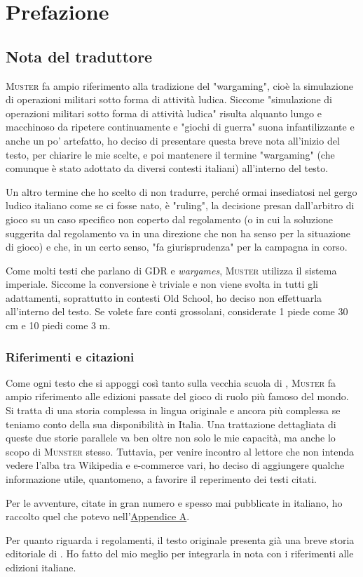 \chapter{Prefazione}

\section{Nota del traduttore}

\textsc{Muster} fa ampio riferimento alla tradizione del "wargaming", cioè la simulazione di operazioni militari sotto forma di attività ludica. Siccome "simulazione di operazioni militari sotto forma di attività ludica" risulta alquanto lungo e macchinoso da ripetere continuamente e "giochi di guerra" suona infantilizzante e anche un po' artefatto, ho deciso di presentare questa breve nota all'inizio del testo, per chiarire le mie scelte, e poi mantenere il termine "wargaming" (che comunque è stato adottato da diversi contesti italiani) all'interno del testo.

Un altro termine che ho scelto di non tradurre, perché ormai insediatosi nel gergo ludico italiano come se ci fosse nato, è "ruling", la decisione presan dall'arbitro di gioco su un caso specifico non coperto dal regolamento (o in cui la soluzione suggerita dal regolamento va in una direzione che non ha senso per la situazione di gioco) e che, in un certo senso, "fa giurisprudenza" per la campagna in corso.

Come molti testi che parlano di GDR e \textit{wargames}, \textsc{Muster} utilizza il sistema imperiale. Siccome la conversione è triviale e non viene svolta in tutti gli adattamenti, soprattutto in contesti Old School, ho deciso non effettuarla all'interno del testo. Se volete fare conti grossolani, considerate 1 piede come 30 cm e 10 piedi come 3 m.

\subsection{Riferimenti e citazioni}

Come ogni testo che si appoggi così tanto sulla vecchia scuola di \dnd{}, \textsc{Muster} fa ampio riferimento alle edizioni passate del gioco di ruolo più famoso del mondo. Si tratta di una storia complessa in lingua originale e ancora più complessa se teniamo conto della sua disponibilità in Italia. Una trattazione dettagliata di queste due storie parallele va ben oltre non solo le mie capacità, ma anche lo scopo di \textsc{Munster} stesso. Tuttavia, per venire incontro al lettore che non intenda vedere l'alba tra Wikipedia e e-commerce vari, ho deciso di aggiungere qualche informazione utile, quantomeno, a favorire il reperimento dei testi citati.

Per le avventure, citate in gran numero e spesso mai pubblicate in italiano, ho raccolto quel che potevo nell'\hyperref[appendix:ita:avventure]{Appendice A}.

Per quanto riguarda i regolamenti, il testo originale presenta già una breve storia editoriale di \dnd{}. Ho fatto del mio meglio per integrarla in nota con i riferimenti alle edizioni italiane.